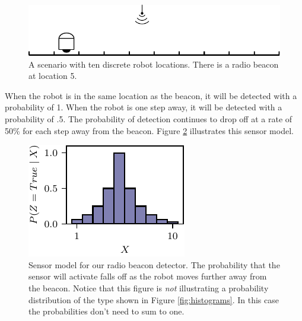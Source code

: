 \begin{figure}
    \begin{center}
  \includegraphics[]{probability/figs/robot_radio.pdf}
   \end{center}
  \caption{A scenario with ten discrete robot locations.  There is a
    radio beacon at location 5.}
  \label{fig:robot_radio}
\end{figure}


When the robot is in the same location as the beacon, it will be
detected with a probability of 1. When the robot is one step away, it
will be detected with a probability of .5. The probability of detection
continues to drop off at a rate of 50\% for each step away from the
beacon. Figure \ref{fig:radio_sensor} illustrates this sensor model.

\begin{figure}
    \begin{center}
  \includegraphics[]{probability/figs/sensor_true.pdf}
   \end{center}
  \caption{Sensor model for our radio beacon detector.  The probability
    that the sensor will activate falls off as the robot moves further
    away from the beacon. Notice that this figure is \emph{not}
    illustrating a probability distribution of the type shown in
    Figure \ref{fig:histograms}. In this case the probabilities
    don't need to sum to one.}
  \label{fig:radio_sensor}
\end{figure}


